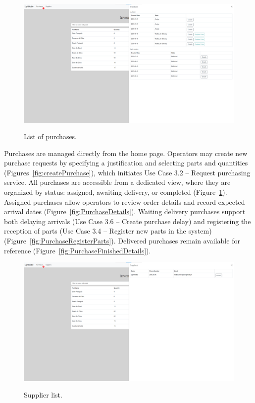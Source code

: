 \begin{figure}[h]
  \caption{List of purchases.}
  \centering
  \includegraphics[width=\textwidth]{figs/Implementation/warehouse/PurchaseList}
  \label{fig:PurchaseList}
\end{figure}






Purchases are managed directly from the home page. Operators may create new purchase requests by specifying a justification and selecting parts and quantities (Figures~\ref{fig:createPurchase}), which initiates Use Case 3.2 – Request purchasing service. All purchases are accessible from a dedicated view, where they are organized by status: assigned, awaiting delivery, or completed (Figure~\ref{fig:PurchaseList}). Assigned purchases allow operators to review order details and record expected arrival dates (Figure~\ref{fig:PurchaseDetails}). Waiting delivery purchases support both delaying arrivals (Use Case 3.6 – Create purchase delay) and registering the reception of parts (Use Case 3.4 – Register new parts in the system) (Figure~\ref{fig:PurchaseRegisterParts}). Delivered purchases remain available for reference (Figure~\ref{fig:PurchaseFinishedDetails}).


\begin{figure}[h]
  \caption{Supplier list.}
  \centering
  \includegraphics[width=\textwidth]{figs/Implementation/warehouse/supplierList}
  \label{fig:supplierList}
\end{figure}




